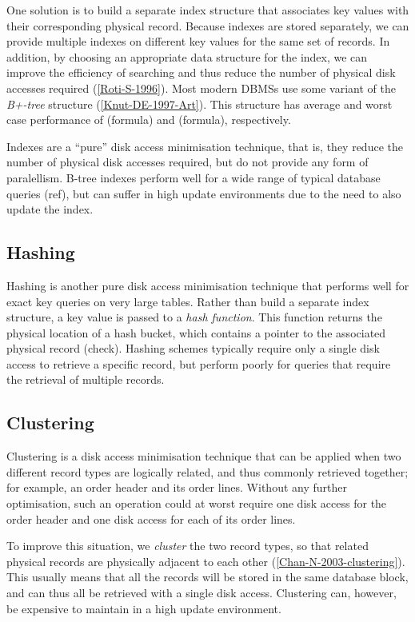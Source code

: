 \documentclass{llncs}
\begin{document}
One solution is to build a separate index structure that associates key values with their corresponding physical record. Because indexes are stored separately, we can provide multiple indexes on different key values for the same set of records. In addition, by choosing an appropriate data structure for the index, we can improve the efficiency of searching and thus reduce the number of physical disk accesses required (\ref{Roti-S-1996}). Most modern DBMSs use some variant of the \emph{B+-tree} structure (\ref{Knut-DE-1997-Art}). This structure has average and worst case performance of (formula) and (formula), respectively.

Indexes are a ``pure'' disk access minimisation technique, that is, they reduce the number of physical disk accesses required, but do not provide any form of paralellism. B-tree indexes perform well for a wide range of typical database queries (ref), but can suffer in high update environments due to the need to also update the index.


\subsection{Hashing}

Hashing is another pure disk access minimisation technique that performs well for exact key queries on very large tables. Rather than build a separate index structure, a key value is passed to a \emph{hash function}. This function returns the physical location of a hash bucket, which contains a pointer to the associated physical record (check). Hashing schemes typically require only a single disk access to retrieve a specific record, but perform poorly for queries that require the retrieval of multiple records.


\subsection{Clustering}

Clustering is a disk access minimisation technique that can be applied when two different record types are logically related, and thus commonly retrieved together; for example, an order header and its order lines. Without any further optimisation, such an operation could at worst require one disk access for the order header and one disk access for each of its order lines.

To improve this situation, we \emph{cluster} the two record types, so that related physical records are physically adjacent to each other (\ref{Chan-N-2003-clustering}). This usually means that all the records will be stored in the same database block, and can thus all be retrieved with a single disk access. Clustering can, however, be expensive to maintain in a high update environment.
\end{document}
